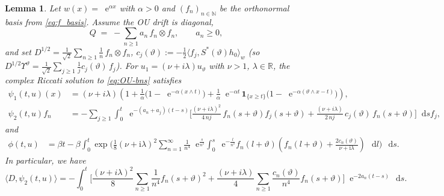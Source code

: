 \documentclass[10pt,a4paper,reqno]{amsart}
\newcommand*\D{\mathop{}\!\mathrm{d}}
\newcommand*\E{\mathop{}\!\mathrm{e}}
\numberwithin{equation}{section}
\newtheorem{lemma}[theorem]{Lemma}
\theoremstyle{plain}
\theoremstyle{definition}
\theoremstyle{example}
\renewcommand{\MR}{\mathbb{R}}
\newcommand{\MN}{\mathbb{N}}
\newcommand{\R}{\MR}
\newcommand{\N}{\MN}
\begin{document}
\begin{lemma}\label{lem:OU-bns-riccati-clean}
Let $w(x)=\E^{\alpha x}$ with $\alpha>0$ and $(f_n)_{n\in\N}$ be the orthonormal basis from \eqref{eq:f_basis}. 
Assume the OU drift is diagonal,
$$
  Q \;=\; -\sum_{n\ge1} a_n\, f_n\otimes f_n, 
  \qquad a_n\ge0,
$$
and set $D^{1/2}=\tfrac{1}{\sqrt2}\sum_{n\ge1}\tfrac{1}{n}\,f_n\otimes f_n$, 
$c_j(\vartheta):=-\tfrac12\langle f_j,S^*(\vartheta)h_0\rangle_w$ (so $D^{1/2}\Upsilon^\vartheta=\tfrac{1}{\sqrt2}\sum_{j\ge1}\tfrac{1}{j}c_j(\vartheta)\,f_j$). 
For $u_1=(\nu+i\lambda)u_\vartheta$ with $\nu>1$, $\lambda\in\R$, the complex Riccati solution to \eqref{eq:OU-bns} satisfies
\begin{align}
  \psi_1(t,u)(x) 
  &= (\nu+i\lambda)\!\left(1+\frac{1}{\alpha}\big(1-\E^{-\alpha(x\wedge t)}\big)
                               +\frac{1}{\alpha}\E^{-\alpha t}\,\mathbf 1_{\{x\geq t\}}
                                  \big(1-\E^{-\alpha(\vartheta\wedge x-t)}\big)\right), \label{eq:psi1-bns-clean}\\[4pt]
  \psi_2(t,u) f_n 
  &= -\sum_{j\geq 1}\int_0^t \E^{-(a_n+a_j)(t-s)}
     \Big[ \frac{(\nu+i\lambda)^2}{4\,n j}\,f_n(s+\vartheta)f_j(s+\vartheta)
           + \frac{(\nu+i\lambda)}{2\,n j}\,c_j(\vartheta)\,f_n(s+\vartheta)\Big]\D s  f_j, 
  \label{eq:psi2-bns-clean}
\end{align}
and
\begin{align}
    \phi(t, u) &= \beta t - \beta \int_0^t \exp\big(\frac{1}{8} (\nu+\mathrm{i}\lambda)^2\sum_{n=1}^\infty\frac{1}{n^4}\E^{\frac{s}{n^2}} \int_0^s \E^{-\frac{l}{n^2}} f_n(l+\vartheta)\left(f_n(l+\vartheta)+\frac{2c_n(\vartheta)}{\nu+\mathrm{i}\lambda}\right)\, \D l\big)\, \D s.\label{eq:phi}
\end{align}
In particular, we have
\begin{equation}\label{eq:Dxi2}
  \langle D,\psi_2(t,u)\rangle
  = -\int_0^t\Big[
       \frac{(\nu+i\lambda)^2}{8}\sum_{n\geq 1}\frac{1}{n^4} f_n(s+\vartheta)^2
       + \frac{(\nu+i\lambda)}{4}\sum_{n\geq 1}\frac{c_n(\vartheta)}{n^4} f_n(s+\vartheta)
     \Big] \E^{-2a_n(t-s)}\,\D s.
\end{equation}
\end{lemma}
\end{document}
